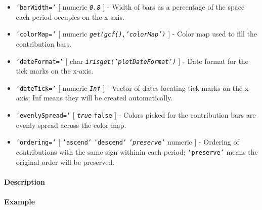  \begin{itemize}
 \item
   \texttt{'barWidth='} {[} numeric \textbar{} \emph{\texttt{0.8}} {]} -
   Width of bars as a percentage of the space each period occupies on the
   x-axis.
 \item
   \texttt{'colorMap='} {[} numeric \textbar{}
   \emph{\texttt{get(gcf(),'colorMap')}} {]} - Color map used to fill the
   contribution bars.
 \item
   \texttt{'dateFormat='} {[} char \textbar{}
   \emph{\texttt{irisget('plotDateFormat')}} {]} - Date format for the
   tick marks on the x-axis.
 \item
   \texttt{'dateTick='} {[} numeric \textbar{} \emph{\texttt{Inf}} {]} -
   Vector of dates locating tick marks on the x-axis; Inf means they will
   be created automatically.
 \item
   \texttt{'evenlySpread='} {[} \emph{\texttt{true}} \textbar{}
   \texttt{false} {]} - Colors picked for the contribution bars are
   evenly spread across the color map.
 \item
   \texttt{'ordering='} {[} \texttt{'ascend'} \textbar{}
   \texttt{'descend'} \textbar{} \emph{\texttt{'preserve'}} \textbar{}
   numeric {]} - Ordering of contributions with the same sign withinin
   each period; \texttt{'preserve'} means the original order will be
   preserved.
 \end{itemize}
 
 \paragraph{Description}
 
 \paragraph{Example}


